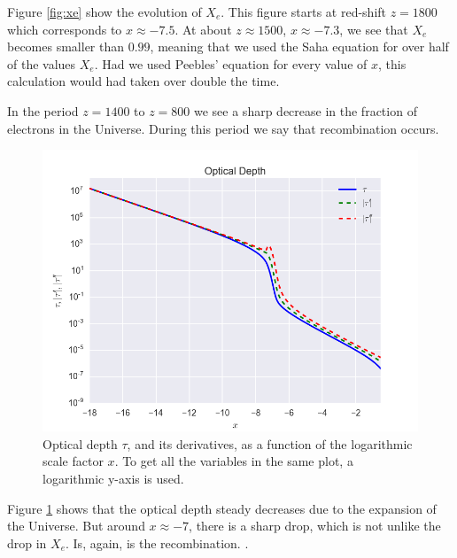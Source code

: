 \documentclass[a4paper,norsk, 10pt]{article}
\begin{document}
Figure \ref{fig:xe} show the evolution of $X_e$. This figure starts at red-shift $z=1800$ which corresponds to $x\approx -7.5$. At about $z\approx 1500$, $x\approx -7.3$, we see that $X_e$ becomes smaller than $0.99$, meaning that we used the Saha equation for over half of the values $X_e$. Had we used Peebles' equation for every value of $x$, this calculation would had taken over double the time.

In the period $z = 1400$ to $z = 800$ we see a sharp decrease in the fraction of electrons in the Universe. During this period we say that recombination occurs.

\begin{figure}[!htb]
\centering
\includegraphics[scale=0.5]{tau.png}
\caption{Optical depth $\tau$, and its derivatives, as a function of the logarithmic scale factor $x$. To get all the variables in the same plot, a logarithmic y-axis is used.}\label{fig:tau}
\end{figure}

Figure \ref{fig:tau} shows that the optical depth steady decreases due to the expansion of the Universe. But around $x\approx -7$, there is a sharp drop, which is not unlike the drop in $X_e$. Is, again, is the recombination. .
\end{document}
